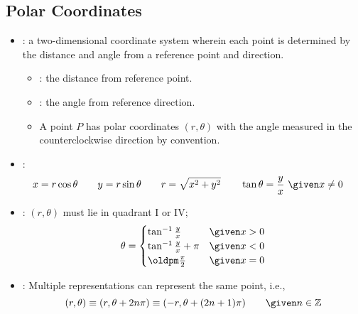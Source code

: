 \subsection{Polar Coordinates}
\begin{itemize}
  \item {}: a two-dimensional coordinate system
    wherein each point is determined by the distance and angle from a reference
    point and direction.
    \begin{itemize}
      \item {}: the distance from reference point.
      \item {}: the angle from reference direction.
      \item A point \(P\) has polar coordinates \((r, \theta)\) with the angle
        measured in the counterclockwise direction by convention.
    \end{itemize}

  \item {}:
    \begin{align*}
      x &= r \cos \theta \qquad
      y = r \sin \theta \qquad
      r = \sqrt{x^2 + y^2} \qquad
      \tan \theta = \frac{y}{x} ~ \given  x\neq 0
    \end{align*}

  \item {}: \((r,\theta)\) must lie in quadrant I or IV;
    \[%
    \theta =
      \begin{cases}
        \tan ^{-1} \frac{y}{x} & \given x > 0 \\
        \tan ^{-1} \frac{y}{x} + \pi & \given x < 0 \\
        \oldpm \frac{\pi}{2} &\given x = 0
      \end{cases}
    \]%

  \item {}: Multiple representations can represent the same point, i.e.,
    \[%
      (r, \theta) \equiv (r, \theta + 2 n \pi) \equiv (-r, \theta + (2n +1)\pi) \qquad \given n \in \mathbb{Z}
    \]%


\end{itemize}

